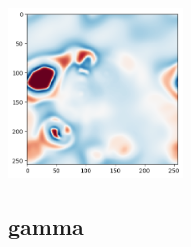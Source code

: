 \begin{center}
\includegraphics[height=4.5cm]{python_codes/fieldstone_171/results/beta2_solution_final_v.png}
\end{center}

\subsection*{gamma}

